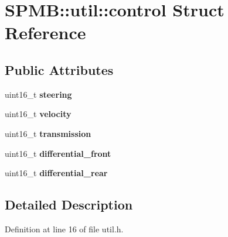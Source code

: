 \hypertarget{structSPMB_1_1util_1_1control}{}\section{S\+P\+MB\+:\+:util\+:\+:control Struct Reference}
\label{structSPMB_1_1util_1_1control}
\subsection*{Public Attributes}
\begin{DoxyCompactItemize}
\item 
uint16\+\_\+t {\bfseries steering}\hypertarget{structSPMB_1_1util_1_1control_a3c5769abea97ec110e185959341d380b}{}\label{structSPMB_1_1util_1_1control_a3c5769abea97ec110e185959341d380b}

\item 
uint16\+\_\+t {\bfseries velocity}\hypertarget{structSPMB_1_1util_1_1control_af70feca597f3e9b5f3455c505168de22}{}\label{structSPMB_1_1util_1_1control_af70feca597f3e9b5f3455c505168de22}

\item 
uint16\+\_\+t {\bfseries transmission}\hypertarget{structSPMB_1_1util_1_1control_a2ba2a5faedcc2325ad316c6d51531317}{}\label{structSPMB_1_1util_1_1control_a2ba2a5faedcc2325ad316c6d51531317}

\item 
uint16\+\_\+t {\bfseries differential\+\_\+front}\hypertarget{structSPMB_1_1util_1_1control_a34fef2f127cc0704f391af42ed05c0e8}{}\label{structSPMB_1_1util_1_1control_a34fef2f127cc0704f391af42ed05c0e8}

\item 
uint16\+\_\+t {\bfseries differential\+\_\+rear}\hypertarget{structSPMB_1_1util_1_1control_a07e85f5ccd5c59ce1d7de56c82b089f2}{}\label{structSPMB_1_1util_1_1control_a07e85f5ccd5c59ce1d7de56c82b089f2}

\end{DoxyCompactItemize}


\subsection{Detailed Description}


Definition at line 16 of file util.\+h.

